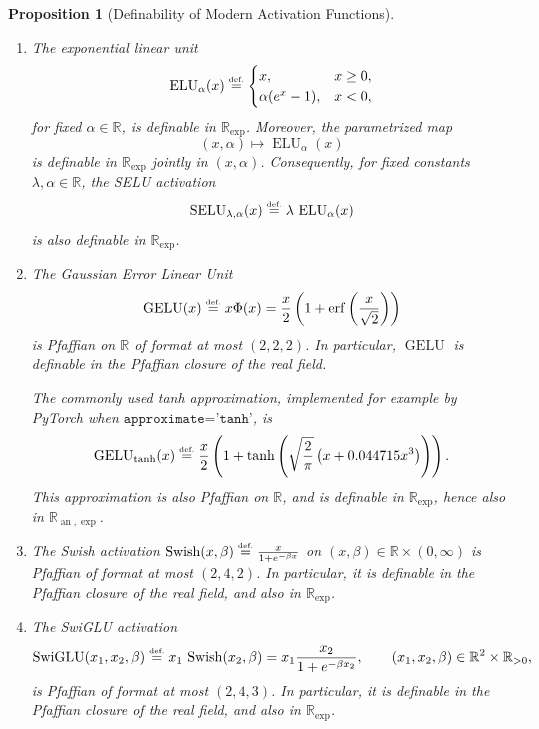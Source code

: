 \documentclass{article}
\newcommand{\eqdef}{\ensuremath{\stackrel{\mbox{\upshape\tiny def.}}{=}}}
\theoremstyle{plain}
\newtheorem{proposition}[theorem]{Proposition}
\theoremstyle{definition}
\theoremstyle{remark}
\theoremstyle{plain}
\numberwithin{thm}{section}
\theoremstyle{definition}
\numberwithin{equation}{section}
\begin{document}
\begin{proposition}[Definability of Modern Activation Functions]
\begin{enumerate}
    \item[(v)] The exponential linear unit
\[
    \operatorname{ELU}_{\alpha}(x)
    \eqdef
    \begin{cases}
        x, & x\ge 0,\\
        \alpha(e^x-1), & x<0,
    \end{cases}
\]
for fixed \(\alpha\in\mathbb{R}\), is definable in \(\mathbb{R}_{\exp}\).
Moreover, the parametrized map
\[
    (x,\alpha)\longmapsto \operatorname{ELU}_{\alpha}(x)
\]
is definable in \(\mathbb{R}_{\exp}\) jointly in \((x,\alpha)\). Consequently,
for fixed constants \(\lambda,\alpha\in\mathbb{R}\), the SELU activation
\[
    \operatorname{SELU}_{\lambda,\alpha}(x)
    \eqdef
    \lambda\,\operatorname{ELU}_{\alpha}(x)
\]
is also definable in \(\mathbb{R}_{\exp}\).

    \item[(vi)] The Gaussian Error Linear Unit
\[
    \operatorname{GELU}(x)
    \eqdef
        x\Phi(x)
    =
        \frac{x}{2}
        \left(
            1+\operatorname{erf}\left(\frac{x}{\sqrt{2}}\right)
        \right)
\]
is Pfaffian on \(\mathbb{R}\) of format at most \((2,2,2)\). In particular,
\(\operatorname{GELU}\) is definable in the Pfaffian closure of the real field.

The commonly used tanh approximation, implemented for example by PyTorch when
\(\texttt{approximate='tanh'}\), is
\[
    \operatorname{GELU}_{\tanh}(x)
    \eqdef
    \frac{x}{2}
    \left(
        1+
        \tanh\left(
            \sqrt{\frac{2}{\pi}}
            \left(x+0.044715x^3\right)
        \right)
    \right).
\]
This approximation is also Pfaffian on \(\mathbb{R}\), and is definable in
\(\mathbb{R}_{\exp}\), hence also in
\(\mathbb{R}_{\operatorname{an},\exp}\).

    \item[(vii)] The Swish activation
    $
        \operatorname{Swish}(x,\beta)
        \eqdef
            \frac{x}{1+e^{-\beta x}}
    $  on 
        $(x,\beta)\in\mathbb{R}\times(0,\infty)$
    is Pfaffian of format at most $(2,4,2)$.  In particular, it is definable in the Pfaffian closure of the real field, and also in $\mathbb{R}_{\exp}$.

    \item[(viii)] The SwiGLU activation
    $$
        \operatorname{SwiGLU}(x_1,x_2,\beta)
        \eqdef
            x_1\,\operatorname{Swish}(x_2,\beta)
        =
            x_1\frac{x_2}{1+e^{-\beta x_2}},
        \qquad
        (x_1,x_2,\beta)\in\mathbb{R}^2\times\mathbb{R}_{>0},
    $$
    is Pfaffian of format at most $(2,4,3)$.  In particular, it is definable in the Pfaffian closure of the real field, and also in $\mathbb{R}_{\exp}$.


\end{enumerate}
\end{proposition}
\end{document}
